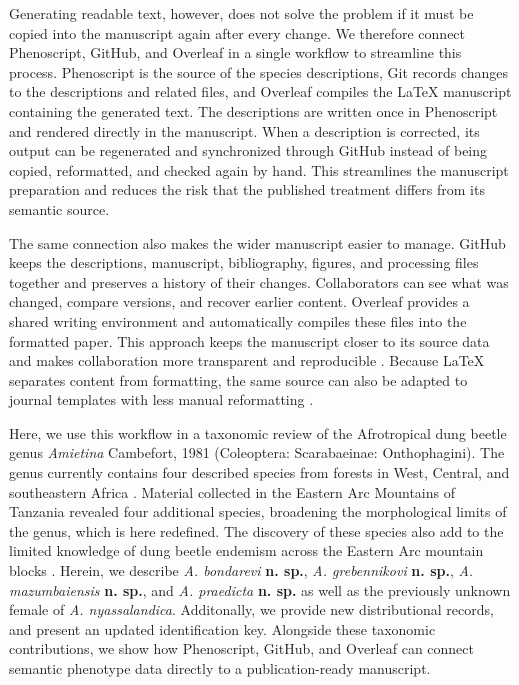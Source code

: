 \documentclass[fleqn,10pt,lineno]{wlpeerj}
\begin{document}
Generating readable text, however, does not solve the problem if it must be copied into the manuscript again after every change. We therefore connect Phenoscript, GitHub, and Overleaf in a single workflow to streamline this process. Phenoscript is the source of the species descriptions, Git records changes to the descriptions and related files, and Overleaf compiles the \LaTeX{} manuscript containing the generated text. The descriptions are written once in Phenoscript and rendered directly in the manuscript. When a description is corrected, its output can be regenerated and synchronized through GitHub instead of being copied, reformatted, and checked again by hand. This streamlines the manuscript preparation and reduces the risk that the published treatment differs from its semantic source.

The same connection also makes the wider manuscript easier to manage. GitHub keeps the descriptions, manuscript, bibliography, figures, and processing files together and preserves a history of their changes. Collaborators can see what was changed, compare versions, and recover earlier content. Overleaf provides a shared writing environment and automatically compiles these files into the formatted paper. This approach keeps the manuscript closer to its source data and makes collaboration more transparent and reproducible \citep{ram2013git, braga2023github, himmelstein2020open}. Because \LaTeX{} separates content from formatting, the same source can also be adapted to journal templates with less manual reformatting \citep{bar2021reproducible, krewinkel2017formatting}.

Here, we use this workflow in a taxonomic review of the Afrotropical dung beetle genus \textit{Amietina} Cambefort, 1981 (Coleoptera: Scarabaeinae: Onthophagini). The genus currently contains four described species from forests in West, Central, and southeastern Africa \citep{cambefort1981amietina, branco1989deux}. Material collected in the Eastern Arc Mountains of Tanzania revealed four additional species, broadening the morphological limits of the genus, which is here redefined. The discovery of these species also add to the limited knowledge of dung beetle endemism across the Eastern Arc mountain blocks \citep{burgess2007biological, montanaro2024microallopatric}. Herein, we describe \textit{A. bondarevi} \textbf{n. sp.}, \textit{A. grebennikovi} \textbf{n. sp.}, \textit{A. mazumbaiensis} \textbf{n. sp.}, and \textit{A. praedicta} \textbf{n. sp.} as well as the previously unknown female of \textit{A. nyassalandica}. Additonally, we provide new distributional records, and present an updated identification key. Alongside these taxonomic contributions, we show how Phenoscript, GitHub, and Overleaf can connect semantic phenotype data directly to a publication-ready manuscript.
\end{document}
